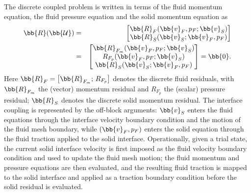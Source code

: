The discrete coupled problem is written in terms of the fluid momentum equation,
the fluid pressure equation and the solid momentum equation as
\begin{eqnarray}
    \bb{R}(\bb{\mathcal{U}})
    &=&
    \begin{bmatrix}
    \bb{R}_F(\bb{v}_F,p_F;\bb{v}_S) \\
    \bb{R}_S(\bb{v}_S;\bb{v}_F,p_F)
    \end{bmatrix} \label{qm:eqn:grouped_coupled_residual} \\
    &=&
    \begin{bmatrix}
    \bb{R}_{F_m}(\bb{v}_F,p_F;\bb{v}_S) \\
    R_{F_p}(\bb{v}_F,p_F;\bb{v}_S) \\
    \bb{R}_S(\bb{v}_S;\bb{v}_F,p_F)
    \end{bmatrix}
    =
    \bb{0}.
    \label{qm:eqn:coupled_residual}
\end{eqnarray}
Here $\bb{R}_F = \left[ \bb{R}_{F_m};\, R_{F_p} \right]$ denotes the discrete fluid residuals, with $\bb{R}_{F_m}$ the (vector) momentum residual and $R_{F_p}$ the (scalar) pressure residual; $\bb{R}_S$ denotes the discrete solid momentum residual.
The interface coupling is represented by the off-block arguments: $\bb{v}_S$ enters the fluid equations through the interface velocity boundary condition and the motion of the fluid mesh boundary, while $(\bb{v}_F,p_F)$ enters the solid equation through the fluid traction applied to the solid interface.
Operationally, given a trial state, the current solid interface velocity is first imposed as the fluid velocity boundary condition and used to update the fluid mesh motion; the fluid momentum and pressure equations are then evaluated, and the resulting fluid traction is mapped to the solid interface and applied as a traction boundary condition before the solid residual is evaluated.

